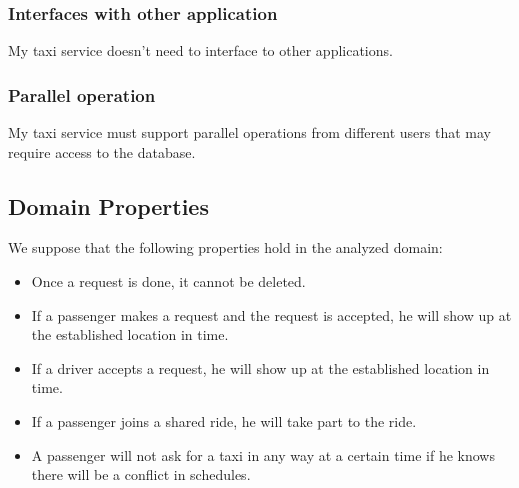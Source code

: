 	\subsubsection{Interfaces with other application}
		My taxi service doesn't need to interface to other applications.
	\subsubsection{Parallel operation}
		My taxi service must support parallel operations from different users that may require access to the database.
\subsection{Domain Properties}
We suppose that the following properties hold in the analyzed domain:
	\begin{itemize}
		\item Once a request is done, it cannot be deleted.
		\item If a passenger makes a request and the request is accepted, he will show up at the established location in time.
		\item If a driver accepts a request, he will show up at the established location in time.
		\item If a passenger joins a shared ride, he will take part to the ride.
		\item A passenger will not ask for a taxi in any way at a certain time if he knows there will be a conflict in schedules.
	\end{itemize}
